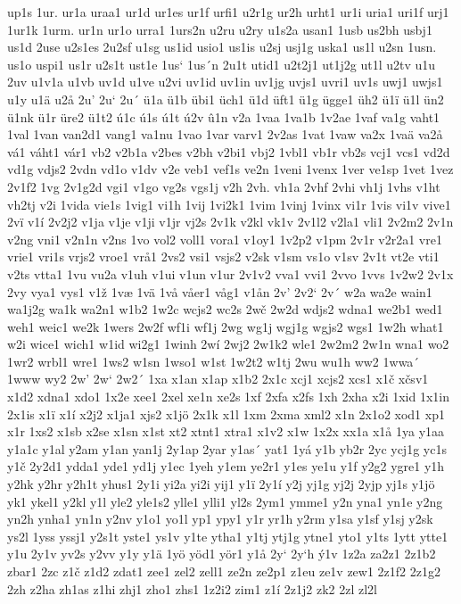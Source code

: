 up1s
1ur.
ur1a
uraa1
ur1d
ur1es
ur1f
urfi1
u2r1g
ur2h
urht1
ur1i
uria1
uri1f
urj1
1ur1k
1urm.
ur1n
ur1o
urra1
1urs2n
u2ru
u2ry
u1s2a
usan1
1usb
us2bh
usbj1
us1d
2use
u2s1es
2u2sf
u1sg
us1id
usio1
us1is
u2sj
usj1g
uska1
us1l
u2sn
1usn.
us1o
uspi1
us1r
u2s1t
ust1e
1us`
1us´n
2u1t
utid1
u2t2j1
ut1j2g
ut1l
u2tv
u1u
2uv
u1v1a
u1vb
uv1d
u1ve
u2vi
uv1id
uv1in
uv1jg
uvjs1
uvri1
uv1s
uwj1
uwjs1
u1y
u1ä
u2å
2u'
2u`
2u´
ü1a
ü1b
übi1
üch1
ü1d
üft1
ü1g
ügge1
üh2
ü1ï
ü1l
ün2
ü1nk
ü1r
üre2
ü1t2
ú1c
ú1s
ú1t
ú2v
û1n
v2a
1vaa
1va1b
1v2ae
1vaf
va1g
vaht1
1val
1van
van2d1
vang1
va1nu
1vao
1var
varv1
2v2as
1vat
1vaw
va2x
1vaä
va2å
vá1
váht1
vár1
vb2
v2b1a
v2bes
v2bh
v2bi1
vbj2
1vbl1
vb1r
vb2s
vcj1
vcs1
vd2d
vd1g
vdjs2
2vdn
vd1o
v1dv
v2e
veb1
vef1s
ve2n
1veni
1venx
1ver
ve1sp
1vet
1vez
2v1f2
1vg
2v1g2d
vgi1
v1go
vg2s
vgs1j
v2h
2vh.
vh1a
2vhf
2vhi
vh1j
1vhs
v1ht
vh2tj
v2i
1vida
vie1s
1vig1
vi1h
1vij
1vi2k1
1vim
1vinj
1vinx
vi1r
1vis
vi1v
vive1
2vï
v1í
2v2j2
v1ja
v1je
v1ji
v1jr
vj2s
2v1k
v2kl
vk1v
2v1l2
v2la1
vli1
2v2m2
2v1n
v2ng
vni1
v2n1n
v2ns
1vo
vol2
voll1
vora1
v1oy1
1v2p2
v1pm
2v1r
v2r2a1
vre1
vrie1
vri1s
vrjs2
vroe1
vrå1
2vs2
vsi1
vsjs2
v2sk
v1sm
vs1o
v1sv
2v1t
vt2e
vti1
v2ts
vtta1
1vu
vu2a
v1uh
v1ui
v1un
v1ur
2v1v2
vva1
vvi1
2vvo
1vvs
1v2w2
2v1x
2vy
vya1
vys1
v1ž
1væ
1vä
1vå
våer1
våg1
v1ån
2v'
2v2`
2v´
w2a
wa2e
wain1
wa1j2g
wa1k
wa2n1
w1b2
1w2c
wcjs2
wc2s
2wč
2w2d
wdjs2
wdna1
we2b1
wed1
weh1
weic1
we2k
1wers
2w2f
wf1i
wf1j
2wg
wg1j
wgj1g
wgjs2
wgs1
1w2h
what1
w2i
wice1
wich1
w1id
wi2g1
1winh
2wí
2wj2
2w1k2
wle1
2w2m2
2w1n
wna1
wo2
1wr2
wrbl1
wre1
1ws2
w1sn
1wso1
w1st
1w2t2
w1tj
2wu
wu1h
ww2
1wwa´
1www
wy2
2w'
2w`
2w2´
1xa
x1an
x1ap
x1b2
2x1c
xcj1
xcjs2
xcs1
x1č
xčsv1
x1d2
xdna1
xdo1
1x2e
xee1
2xel
xe1n
xe2s
1xf
2xfa
x2fs
1xh
2xha
x2i
1xid
1x1in
2x1is
x1ï
x1í
x2j2
x1ja1
xjs2
x1jö
2x1k
x1l
1xm
2xma
xml2
x1n
2x1o2
xod1
xp1
x1r
1xs2
x1sb
x2se
x1sn
x1st
xt2
xtnt1
xtra1
x1v2
x1w
1x2x
xx1a
x1å
1ya
y1aa
y1a1c
y1al
y2am
y1an
yan1j
2y1ap
2yar
y1as´
yat1
1yá
y1b
yb2r
2yc
ycj1g
yc1s
y1č
2y2d1
ydda1
yde1
yd1j
y1ec
1yeh
y1em
ye2r1
y1es
ye1u
y1f
y2g2
ygre1
y1h
y2hk
y2hr
y2h1t
yhus1
2y1i
yi2a
yi2i
yij1
y1ï
2y1í
y2j
yj1g
yj2j
2yjp
yj1s
y1jö
yk1
ykel1
y2kl
y1l
yle2
yle1s2
ylle1
ylli1
yl2s
2ym1
ymme1
y2n
yna1
yn1e
y2ng
yn2h
ynha1
yn1n
y2nv
y1o1
yo1l
yp1
ypy1
y1r
yr1h
y2rm
y1sa
y1sf
y1sj
y2sk
ys2l
1yss
yssj1
y2s1t
yste1
ys1v
y1te
ytha1
y1tj
ytj1g
ytne1
yto1
y1ts
1ytt
ytte1
y1u
2y1v
yv2s
y2vv
y1y
y1ä
1yö
yöd1
yör1
y1å
2y`
2y`h
ý1v
1z2a
za2z1
2z1b2
zbar1
2zc
z1č
z1d2
zdat1
zee1
zel2
zell1
ze2n
ze2p1
z1eu
ze1v
zew1
2z1f2
2z1g2
2zh
z2ha
zh1as
z1hi
zhj1
zho1
zhs1
1z2i2
zim1
z1í
2z1j2
zk2
2zl
zl2l
